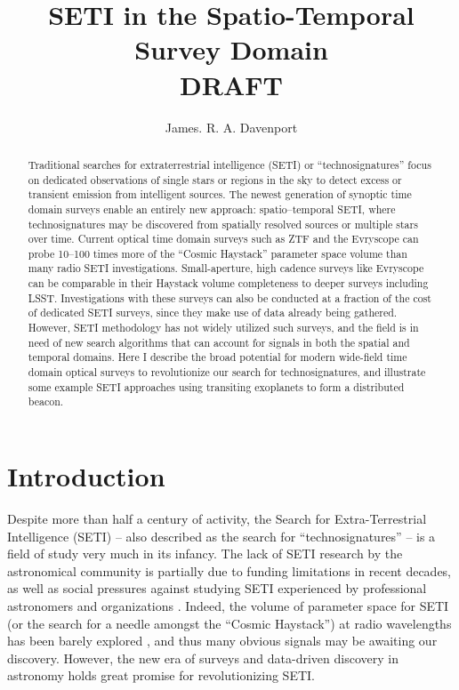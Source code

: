 \documentclass[twocolumn]{aastex62}
\begin{document}
\title{SETI in the Spatio-Temporal Survey Domain \\
{\color{red} {\bf DRAFT} }
}



\author{James. R. A. Davenport}


\begin{abstract}
Traditional searches for extraterrestrial intelligence (SETI) or ``technosignatures'' focus on dedicated observations of single stars or regions in the sky to detect excess or transient emission from intelligent sources. The newest generation of synoptic time domain surveys enable an entirely new approach: spatio--temporal SETI, where technosignatures may be discovered from spatially resolved sources or multiple stars over time. 
Current optical time domain surveys such as ZTF and the Evryscope can probe 10--100 times more of the ``Cosmic Haystack'' parameter space volume than many radio SETI investigations. Small-aperture, high cadence surveys like Evryscope can be comparable in their Haystack volume completeness to deeper surveys including LSST. Investigations with these surveys can also be conducted at a fraction of the cost of dedicated SETI surveys, since they make use of data already being gathered. 
However, SETI methodology has not widely utilized such surveys, and the field is in need of new search algorithms that can account for signals in both the spatial and temporal domains.
Here I describe the broad potential for modern wide-field time domain optical surveys to revolutionize our search for technosignatures, and illustrate some example SETI approaches using transiting exoplanets to form a distributed beacon.
\end{abstract}





\section{Introduction}

Despite more than half a century of activity, the Search for Extra-Terrestrial Intelligence (SETI) -- also described as the search for ``technosignatures'' -- is a field of study very much in its infancy. 
The lack of SETI research by the astronomical community is partially due to funding limitations in recent decades, as well as social pressures against studying SETI experienced by professional astronomers and organizations \citep{wright2018b}. 
Indeed, the volume of parameter space for SETI (or the search for a needle amongst the ``Cosmic Haystack'') at radio wavelengths has been barely explored \citet{wright2018c}, and thus many obvious signals may be awaiting our discovery. 
However, the new era of surveys and data-driven discovery in astronomy holds great promise for revolutionizing SETI.
\end{document}
